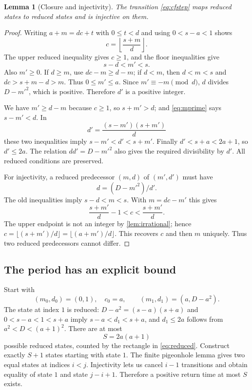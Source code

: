 \documentclass[11pt,letterpaper]{article}
\newtheorem{lemma}[theorem]{Lemma}
\theoremstyle{definition}
\begin{document}
\begin{lemma}[Closure and injectivity]\label{lem:reduced}
The transition \eqref{eq:cfstep} maps reduced states to reduced states and
is injective on them.
\end{lemma}
\begin{proof}
Writing $a+m=dc+t$ with $0\le t<d$ and using $0<s-a<1$ shows
\[
 c=\left\lfloor\frac{s+m}{d}\right\rfloor.
\]
The upper reduced inequality gives $c\ge1$, and the floor inequalities give
\begin{equation}\label{eq:mprime}
 s-d<m'<s.
\end{equation}
Also $m'\ge0$. If $d\ge m$, use $dc-m\ge d-m$; if $d<m$, then
$d<m<s$ and $dc>s+m-d>m$.
Thus $0\le m'\le a$. Since $m'\equiv-m\pmod d$, $d$ divides
$D-m'^2$, which is positive. Therefore $d'$ is a positive integer.

We have $m'\ge d-m$ because $c\ge1$, so $s+m'>d$; and
\eqref{eq:mprime} says $s-m'<d$. In
\[
 d'=\frac{(s-m')(s+m')}{d}
\]
these two inequalities imply
$s-m'<d'<s+m'$. Finally $d'<s+a<2a+1$, so $d'\le2a$.
The relation $dd'=D-m'^2$ also gives the required divisibility by $d'$.
All reduced conditions are preserved.

For injectivity, a reduced predecessor $(m,d)$ of $(m',d')$ must have
\[
 d=(D-m'^2)/d'.
\]
The old inequalities imply $s-d<m<s$. With $m=dc-m'$ this gives
\[
 \frac{s+m'}d-1<c<\frac{s+m'}d.
\]
The upper endpoint is not an integer by \cref{lem:irrational}; hence
$c=\lfloor(s+m')/d\rfloor=\lfloor(a+m')/d\rfloor$. This recovers $c$
and then $m$ uniquely. Thus two reduced predecessors cannot differ.
\end{proof}

\subsection{The period has an explicit bound}

Start with
\[
 (m_0,d_0)=(0,1),\quad c_0=a,
 \qquad (m_1,d_1)=(a,D-a^2).
\]
The state at index $1$ is reduced: $D-a^2=(s-a)(s+a)$ and
$0<s-a<1<s+a$ imply $s-a<d_1<s+a$, and $d_1\le2a$ follows from
$a^2<D<(a+1)^2$.
There are at most
\begin{equation}\label{eq:S}
 S=2a(a+1)
\end{equation}
possible reduced states, counted by the rectangle in \eqref{eq:reduced}.
Construct exactly $S+1$ states starting with state $1$. The finite
pigeonhole lemma gives two equal states at indices $i<j$. Injectivity lets
us cancel $i-1$ transitions and obtain equality of state $1$ and state
$j-i+1$. Therefore a positive return time at most $S$ exists.
\end{document}
